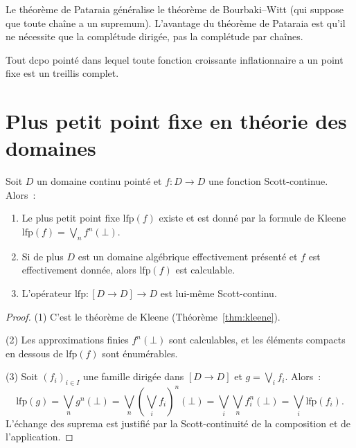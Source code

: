 \begin{remarque}
Le th\'eor\`eme de Pataraia g\'en\'eralise le th\'eor\`eme de Bourbaki--Witt (qui suppose
que toute cha\^ine a un supremum). L'avantage du th\'eor\`eme de Pataraia est qu'il ne
n\'ecessite que la compl\'etude dirig\'ee, pas la compl\'etude par cha\^ines.
\end{remarque}

\begin{corollaire}
Tout dcpo point\'e dans lequel toute fonction croissante inflationnaire a un point fixe
est un treillis complet.
\end{corollaire}

\section{Plus petit point fixe en th\'eorie des domaines}

\begin{theoreme}
\label{thm:lfp-domain}
Soit $D$ un domaine continu point\'e et $f\colon D \to D$ une fonction Scott-continue.
Alors~:
\begin{enumerate}
  \item Le plus petit point fixe $\mathrm{lfp}(f)$ existe et est donn\'e par la formule
    de Kleene $\mathrm{lfp}(f) = \bigvee_n f^n(\bot)$.
  \item Si de plus $D$ est un domaine alg\'ebrique effectivement pr\'esent\'e et $f$ est
    effectivement donn\'ee, alors $\mathrm{lfp}(f)$ est calculable.
  \item L'op\'erateur $\mathrm{lfp}\colon [D \to D] \to D$ est lui-m\^eme Scott-continu.
\end{enumerate}
\end{theoreme}

\begin{proof}
(1) C'est le th\'eor\`eme de Kleene (Th\'eor\`eme~\ref{thm:kleene}).

(2) Les approximations finies $f^n(\bot)$ sont calculables, et les \'el\'ements compacts
en dessous de $\mathrm{lfp}(f)$ sont \'enum\'erables.

(3) Soit $(f_i)_{i \in I}$ une famille dirig\'ee dans $[D \to D]$ et $g = \bigvee_i f_i$.
Alors~:
\[
  \mathrm{lfp}(g) = \bigvee_n g^n(\bot) = \bigvee_n \left(\bigvee_i f_i\right)^n(\bot)
  = \bigvee_i \bigvee_n f_i^n(\bot) = \bigvee_i \mathrm{lfp}(f_i).
\]
L'\'echange des suprema est justifi\'e par la Scott-continuit\'e de la composition et de
l'application.
\end{proof}

